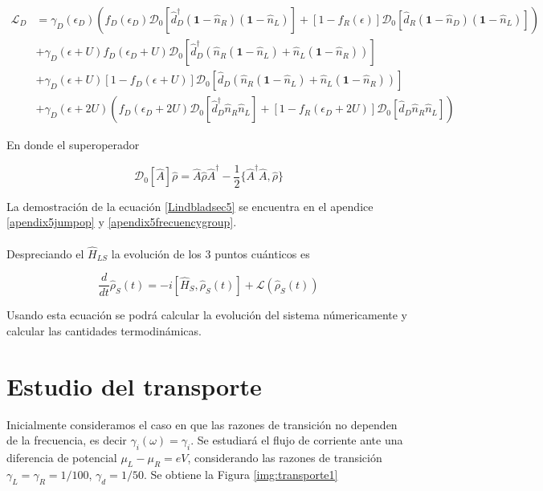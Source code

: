 \begin{align*}
    \mathcal{L}_{D} & = \gamma_{D}(\epsilon_{D})(f_{D}(\epsilon_{D})\mathcal{D}_{0}[\hat{d}^{\dagger}_{D}(\textbf{1}-\hat{n}_{R})(\textbf{1}-\hat{n}_{L}) ]  + [1-f_{R}(\epsilon)]\mathcal{D}_{0}[\hat{d}_{R}(\textbf{1}-\hat{n}_{D})(\textbf{1}-\hat{n}_{L}) ]  )  \\
                    & + \gamma_{D}(\epsilon+U)f_{D}(\epsilon_{D}+U)\mathcal{D}_{0}[\hat{d}^{\dagger}_{D}(\hat{n}_{R}(\textbf{1}-\hat{n}_{L}) + \hat{n}_{L}(\textbf{1}-\hat{n}_{R})) ]  \\
                    & + \gamma_{D}(\epsilon+U)[1-f_{D}(\epsilon+U)]\mathcal{D}_{0}[\hat{d}_{D}(\hat{n}_{R}(\textbf{1}-\hat{n}_{L}) + \hat{n}_{L}(\textbf{1}-\hat{n}_{R}))]   \\
                   & + \gamma_{D}(\epsilon+2U)(f_{D}(\epsilon_{D}+2U)\mathcal{D}_{0}[\hat{d}^{\dagger}_{D}\hat{n}_{R}\hat{n}_{L} ]  + [1-f_{R}(\epsilon_{D}+2U)]\mathcal{D}_{0}[\hat{d}_{D}\hat{n}_{R}\hat{n}_{L} ]  )    
\end{align*}

En donde el superoperador 

\begin{equation*}
    \mathcal{D}_{0}[\hat{A}]\hat{\rho} = \hat{A}\hat{\rho}\hat{A}^{\dagger}- \frac{1}{2} \{\hat{A }^{\dagger}\hat{A},\hat{\rho} \}
\end{equation*}

La demostración de la ecuación \ref{Lindbladsec5} se encuentra en el apendice \ref{apendix5jumpop} y \ref{apendix5frecuencygroup}.\\
\\
Despreciando el $\hat{H}_{LS}$ \cite{prech2023entanglement} la evolución de los 3 puntos cuánticos es

\begin{equation*}
    \frac{d}{dt}\hat{\rho}_{S}(t) = -i[\hat{H}_{S},\hat{\rho}_{S}(t)] + \mathcal{L}(\hat{\rho}_{S}(t))
\end{equation*}

Usando esta ecuación se podrá calcular la evolución del sistema númericamente y calcular las cantidades termodinámicas.


\label{sec5:modelo}

\newpage

\section{Estudio del transporte}
Inicialmente consideramos el caso en que las razones de transición no dependen de la frecuencia, es decir $\gamma_{i}(\omega) = \gamma_{i}$. Se estudiará el flujo de corriente ante una diferencia de potencial $\mu_{L}-\mu_{R} = eV$, considerando las razones de transición $\gamma_{L}=\gamma_{R}=1/100$, $\gamma_{d}=1/50$. Se obtiene la Figura \ref{img:transporte1}

